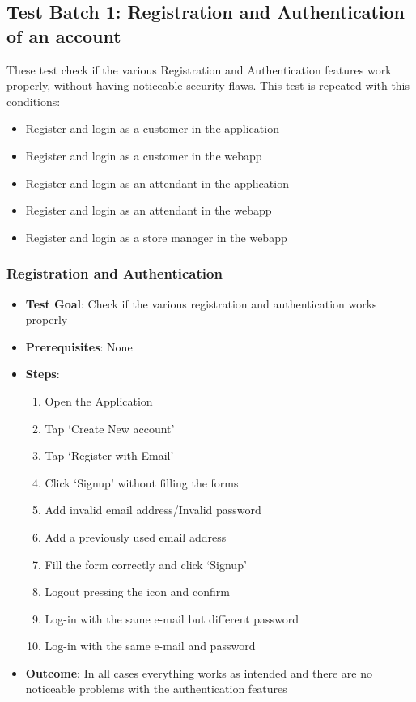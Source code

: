 \subsection{Test Batch 1: Registration and Authentication of an account}
These test check if the various Registration and Authentication features work properly, without having noticeable security flaws.
This test is repeated with this conditions:
\begin{itemize}
    \item Register and login as a customer in the application
    \item Register and login as a customer in the webapp
    \item Register and login as an attendant in the application
    \item Register and login as an attendant in the webapp
    \item Register and login as a store manager in the webapp
\end{itemize}
\subsubsection{Registration and Authentication}
\begin{itemize}
    \item \textbf{Test Goal}: Check if the various registration and authentication works properly
    \item \textbf{Prerequisites}: None
    \item \textbf{Steps}:
        \begin{enumerate}
            \item Open the Application
            \item Tap `Create New account'
            \item Tap `Register with Email'
            \item Click `Signup' without filling the forms
            \item Add invalid email address/Invalid password
            \item Add a previously used email address
            \item Fill the form correctly and click `Signup'
            \item Logout pressing the icon and confirm
            \item Log-in with the same e-mail but different password
            \item Log-in with the same e-mail and password
        \end{enumerate}
    \item \textbf{Outcome}: In all cases everything works as intended and there are no noticeable problems with the authentication features
\end{itemize}


